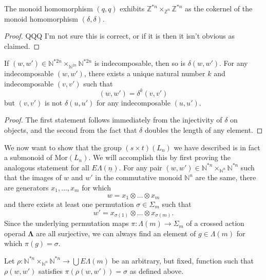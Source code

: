 \documentclass{amsbook} %
\newcommand{\ML}{\mathbf{\Lambda}}
\newcommand{\MorLn}{\mathrm{Mor}(L_n)}
\newcommand{\EL}{E\Lambda}
\newcommand{\ELn}{E\Lambda(\underline{n})}
\numberwithin{section}{chapter}
\begin{document}
\begin{lem}\label{monoid_coeq}
The monoid homomorphism $(q,q)$ exhibits $\mathbb{Z}^{\ast n} \times_{\mathbb{Z}^n} \mathbb{Z}^{\ast n}$ as the cokernel of the monoid homomorphism $(\delta, \delta)$.
\end{lem}
\begin{proof}
QQQ I'm not sure this is correct, or if it is then it isn't obvious as claimed.
\end{proof}

\begin{lem}\label{rho_lemmas}
If $(w,w') \in \mathbb{N}^{\ast 2n} \times_{\mathbb{N}^{2n}} \mathbb{N}^{\ast 2n}$ is indecomposable, then so is $\delta(w,w')$. For any indecomposable $(w,w')$, there exists a unique natural number $k$ and indecomposable $(v,v')$ such that
  \[
    (w,w') = \delta^k(v,v')
  \]
but $(v,v')$ is not $\delta(u,u')$ for any indecomposable $(u,u')$.
\end{lem}
\begin{proof}
The first statement follows immediately from the injectivity of $\delta$ on objects, and the second from the fact that $\delta$ doubles the length of any element.
\end{proof}


We now want to show that the group $(s \times t)(L_n)$ we have described is in fact a submonoid of $\MorLn$.  We will accomplish this  by first proving the analogous statement for all $\ELn$.  For any pair $(w, w') \in \mathbb{N}^{\ast n} \times_{\mathbb{N}^n} \mathbb{N}^{\ast n}$ such that the images of $w$ and $w'$ in the commutative monoid $\mathbb{N}^n$ are the same, there are generators $x_1, \ldots, x_m$ for which 
  \[
    w = x_1 \otimes \ldots \otimes x_m
  \]
and there exists at least one permutation $\sigma \in \Sigma_m$ such that
  \[
    w' = x_{\sigma(1)} \otimes \ldots \otimes x_{\sigma(m)}.
  \]
Since the underlying permutation maps $\pi \colon \Lambda(m) \rightarrow \Sigma_m$ of a crossed action operad $\ML$ are all surjective, we can always find an element of $g \in \Lambda(m)$ for which $\pi(g) = \sigma$. 

\begin{nota}\label{rho_ww'}
Let $\rho \colon \mathbb{N}^{\ast n} \times_{\mathbb{N}^n} \mathbb{N}^{\ast n} \rightarrow \bigcup \EL(m)$ be an arbitrary, but fixed, function such that $\rho(w,w')$ satisfies $\pi(\rho(w,w')) = \sigma$ as defined above.
\end{nota}
\end{document}
